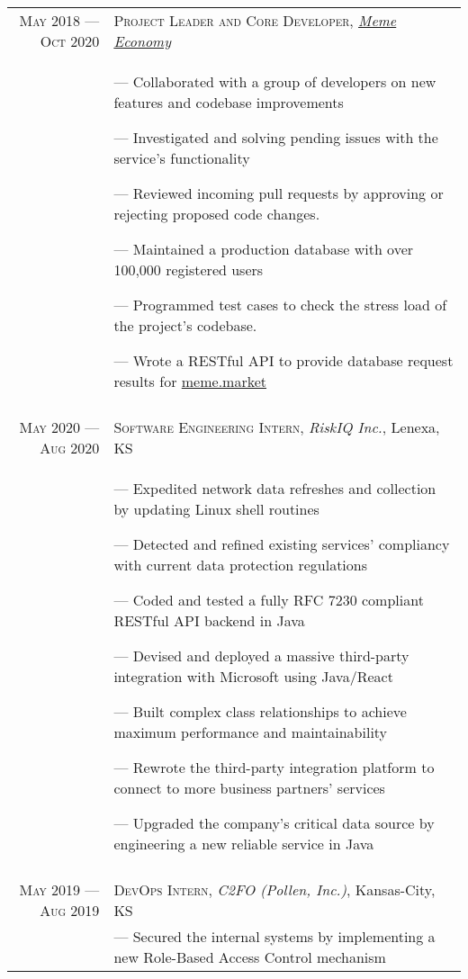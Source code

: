 \documentclass[letterpaper, 10pt]{article}
\begin{document}
\begin{tabular}{r|p{12cm}}
	\textsc{May 2018 --- Oct 2020} & \textsc{Project Leader and Core Developer}, \emph{\href{https://meme.market}{Meme Economy}} \\&\footnotesize{
		--- Collaborated with a group of developers on new features and codebase improvements

		--- Investigated and solving pending issues with the service's functionality

		--- Reviewed incoming pull requests by approving or rejecting proposed code changes.

		--- Maintained a production database with over 100,000 registered users

		--- Programmed test cases to check the stress load of the project's codebase.

		--- Wrote a RESTful API to provide database request results for \href{https://meme.market}{meme.market}
	}                                                                                                                            \\\multicolumn{2}{c}{}\\

	\textsc{May 2020 --- Aug 2020} & \textsc{Software Engineering Intern}, \emph{RiskIQ Inc.}, Lenexa, KS                        \\&\footnotesize{
		--- Expedited network data refreshes and collection by updating Linux shell routines

		--- Detected and refined existing services' compliancy with current data protection regulations

		--- Coded and tested a fully RFC 7230 compliant RESTful API backend in Java

		--- Devised and deployed a massive third-party integration with Microsoft using Java/React

		--- Built complex class relationships to achieve maximum performance and maintainability

		--- Rewrote the third-party integration platform to connect to more business partners' services

		--- Upgraded the company's critical data source by engineering a new reliable service in Java
	}                                                                                                                            \\\multicolumn{2}{c}{}\\

	\textsc{May 2019 --- Aug 2019} & \textsc{DevOps Intern}, \emph{C2FO (Pollen, Inc.)}, Kansas-City, KS                         \\&\footnotesize{
		--- Secured the internal systems by implementing a new Role-Based Access Control mechanism

}
\end{tabular}
\end{document}

